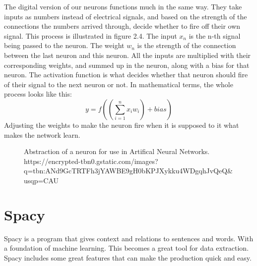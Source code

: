 The digital version of our neurons functions much in the same way.
They take inputs as numbers instead of electrical signals, and based on the strength of the connections the numbers arrived through, decide whether to fire off their own signal.
This process is illustrated in figure 2.4.
The input $x_n$ is the n-th signal being passed to the neuron.
The weight $w_n$ is the strength of the connection between the last neuron and this neuron.
All the inputs are multiplied with their corresponding weights, and summed up in the neuron, along with a bias for that neuron.
The activation function is what decides whether that neuron should fire of their signal to the next neuron or not.
In mathematical terms, the whole process looks like this: \[y = f(\left(\sum_{i=1}^{n} x_i w_i\right) + bias)\]
Adjusting the weights to make the neuron fire when it is supposed to it what makes the network learn.

\begin{figure}[h]
    \caption{Abstraction of a neuron for use in Artifical Neural Networks. https://encrypted-tbn0.gstatic.com/images?q=tbn:ANd9GcTRTFh3jYAWBE9gH0bKPJXykku4WDgqhJvQeQ&usqp=CAU}
    \label{fig:figure2.4}
\end{figure}

\section{Spacy}\label{sec:spacy}

Spacy is a program that gives context and relations to sentences and words.
With a foundation of machine learning.
This becomes a great tool for data extraction.
Spacy includes some great features that can make the production quick and easy.

